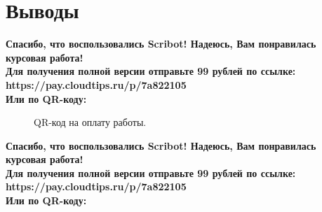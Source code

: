 \documentclass{article}
\begin{document}
\section{Выводы}
\begin{center}
    \textbf{
        Спасибо, что воспользовались Scribot! Надеюсь, Вам понравилась курсовая работа!\\
        Для получения полной версии отправьте 99 рублей по ссылке:\\
        https://pay.cloudtips.ru/p/7a822105\\
        Или по QR-коду:\\
    }
\end{center}
\begin{figure}[h]
    \caption{QR-код на оплату работы.}
    \label{ris:image}
\end{figure}
\newpage
\begin{center}
    \textbf{
        Спасибо, что воспользовались Scribot! Надеюсь, Вам понравилась курсовая работа!\\
        Для получения полной версии отправьте 99 рублей по ссылке:\\
        https://pay.cloudtips.ru/p/7a822105\\
        Или по QR-коду:\\
    }
\end{center}
\end{document}
